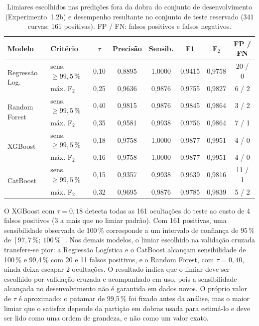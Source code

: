 \begin{table}[htbp]
\centering
\caption{Limiares escolhidos nas predições fora da dobra do conjunto de desenvolvimento (Experimento~1.2b) e desempenho resultante no conjunto de teste reservado (341 curvas; 161 positivas). FP / FN: falsos positivos e falsos negativos.}
\label{tab:threshold_comparacao}
\footnotesize
\begin{tabular}{llcccccc}
\hline
\textbf{Modelo} & \textbf{Critério} & $\tau$ & \textbf{Precisão} & \textbf{Sensib.} & \textbf{F1} & \textbf{F$_2$} & \textbf{FP / FN} \\
\hline
\multirow{2}{*}{Regressão Log.} & sens. $\geq 99{,}5\,\%$ & 0{,}10 & 0{,}8895 & 1{,}0000 & 0{,}9415 & 0{,}9758 & 20 / 0 \\
 & máx. F$_2$ & 0{,}25 & 0{,}9636 & 0{,}9876 & 0{,}9755 & 0{,}9827 & 6 / 2 \\
\hline
\multirow{2}{*}{Random Forest} & sens. $\geq 99{,}5\,\%$ & 0{,}40 & 0{,}9815 & 0{,}9876 & 0{,}9845 & 0{,}9864 & 3 / 2 \\
 & máx. F$_2$ & 0{,}35 & 0{,}9581 & 0{,}9938 & 0{,}9756 & 0{,}9864 & 7 / 1 \\
\hline
\multirow{2}{*}{XGBoost} & sens. $\geq 99{,}5\,\%$ & 0{,}18 & 0{,}9758 & 1{,}0000 & 0{,}9877 & 0{,}9951 & 4 / 0 \\
 & máx. F$_2$ & 0{,}16 & 0{,}9758 & 1{,}0000 & 0{,}9877 & 0{,}9951 & 4 / 0 \\
\hline
\multirow{2}{*}{CatBoost} & sens. $\geq 99{,}5\,\%$ & 0{,}15 & 0{,}9357 & 0{,}9938 & 0{,}9639 & 0{,}9816 & 11 / 1 \\
 & máx. F$_2$ & 0{,}32 & 0{,}9695 & 0{,}9876 & 0{,}9785 & 0{,}9839 & 5 / 2 \\
\hline
\end{tabular}
\end{table}

O XGBoost com $\tau = 0{,}18$ detecta todas as 161 ocultações do teste ao custo de 4 falsos positivos (3 a mais que no limiar padrão). Com 161 positivas, uma sensibilidade observada de 100\,\% corresponde a um intervalo de confiança de 95\,\% de $[97{,}7\,\%;\ 100\,\%]$. Nos demais modelos, o limiar escolhido na validação cruzada transfere-se pior: a Regressão Logística e o CatBoost alcançam sensibilidade de 100\,\% e 99,4\,\% com 20 e 11 falsos positivos, e o Random Forest, com $\tau = 0{,}40$, ainda deixa escapar 2 ocultações. O resultado indica que o limiar deve ser escolhido por validação cruzada e acompanhado em uso, pois a sensibilidade alcançada no desenvolvimento não é garantida em dados novos. O próprio valor de $\tau$ é aproximado: o patamar de 99,5\,\% foi fixado antes da análise, mas o maior limiar que o satisfaz depende da partição em dobras usada para estimá-lo e deve ser lido como uma ordem de grandeza, e não como um valor exato.

